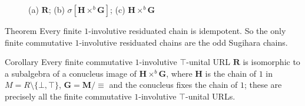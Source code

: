 \documentclass[professionalfont, handout, 12pt]{beamer} %
\theoremstyle{plain}
\theoremstyle{definition}
\newcommand{\m}[1]{{\mathbf {#1} }}
\begin{document}
\begin{frame}{}
\begin{figure}
{    
    }
\caption{(a) $\m R$; (b) $\sigma[\m H \times^b \m G]$; (c) $\m H \times^b \m G$}
\end{figure}
\end{frame}

\begin{comment}
\begin{frame}{}
    \begin{block}{Lemma}
        Let $\m R$ be a non-linear $1$-involutive $\top$-unital URL.
        Then $\m R$ is compact and $\m G = (M, \cdot, 1) / {\equiv}$ is a group, where $M = R \setminus \{\bot, \top\}$ and $\equiv$ is the comparability relation on $\m M$.
    \end{block}
    \pause
    
    \begin{block}{Theorem}
        Let $\m R$ be a commutative $1$-involutive compact URL such that the chain of $1$, $H \cup \{\bot, \top\}$, is a bounded odd Sugihara chain and $\m M / {\equiv} \cong \m G$, where $\m G$ is an abelian group where every element has finite order.
        Then $\m R$ is isomorphic to a subalgebra of a conucleus image of $\m H \times^b \m G$.
    \end{block}
\end{frame}
\end{comment}

\begin{frame}{}
    \begin{block}{Theorem}
        Every finite $1$-involutive residuated chain is idempotent.
        So the only finite commutative $1$-involutive residuated chains are the odd Sugihara chains.
    \end{block}
    \pause
    \medskip
    
    \begin{block}{Corollary}
        Every finite commutative $1$-involutive $\top$-unital URL $\m R$ is isomorphic to a subalgebra of a conucleus image of $\m H \times^b \m G$, where $\m H$ is the chain of $1$ in $M = R \setminus \{\bot, \top\}$, $\m G = \m M / {\equiv}$ and the conucleus fixes the chain of $1$; these are precisely all the finite commutative $1$-involutive $\top$-unital URLs.
    \end{block}
\end{frame}
\end{document}
